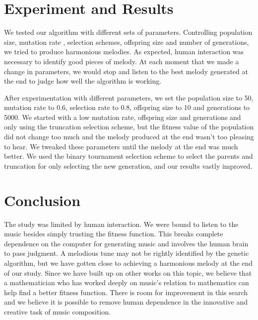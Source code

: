 \documentclass[conference]{IEEEtran}
\begin{document}
\section{Experiment and Results}
We tested our algorithm with different sets of parameters. Controlling population size, mutation rate , selection schemes, offspring size and number of generations, we tried to produce harmonious melodies. As expected, human interaction was necessary to identify good pieces of melody. At each moment that we made a change in parameters, we would stop and listen to the best melody generated at the end to judge how well the algorithm is working.

After experimentation with different parameters, we set the population size to 50, mutation rate to 0.6, selection rate to 0.8, offspring size to 10 and generations to 5000. We started with a low mutation rate, offspring size and generations and only using the truncation selection scheme, but the fitness value of the population did not change too much and the melody produced at the end wasn't too pleasing to hear. We tweaked these parameters until the melody at the end was much better. We used the binary tournament selection scheme to select the parents and truncation for only selecting the new generation, and our results vastly improved.

\section{Conclusion}
The study was limited by human interaction. We were bound to listen to the music besides simply trusting the fitness function. This breaks complete dependence on the computer for generating music and involves the human brain to pass judgment. A melodious tune may not be rightly identified by the genetic algorithm, but we have gotten close to achieving a harmonious melody at the end of our study. Since we have built up on other works on this topic, we believe that a mathematician who has worked deeply on music's relation to mathematics can help find a better fitness function. There is room for improvement in this search and we believe it is possible to remove human dependence in the innovative and creative task of music composition.
\end{document}
